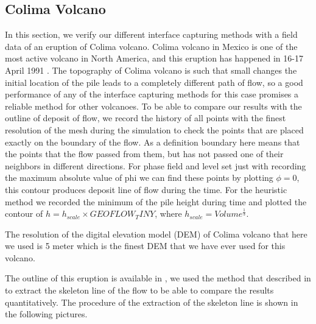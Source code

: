 \documentclass[letterpaper,10pt]{article}
\begin{document}
\subsection{Colima Volcano}
In this section, we verify our different interface capturing methods with a field data of an eruption of Colima volcano. 
Colima volcano in Mexico is one of the most active volcano in North America, and this eruption has happened in 16-17 April 1991 \cite{}. 
The topography of Colima volcano is such that small changes the initial location of the pile leads to a completely different 
path of flow, so a good performance of any of the interface capturing methods for this case promises a reliable method for other volcanoes.
To be able to compare our results with the outline of deposit of flow, we record the history of all points with the finest 
resolution of the mesh during the simulation to check the points that are placed exactly on the boundary of the flow. 
As a definition boundary here means that the points that the flow passed from them, but has not passed one of their neighbors 
in different directions. For phase field and level set just with recording the maximum absolute value of phi we can find 
these points by plotting $\phi=0$, this contour produces deposit line of flow during the time. For the heuristic method we 
recorded the minimum of the pile height during time and plotted the contour of $ h = h_{scale} \times GEOFLOW_TINY$, where 
$ h_{scale} =Volume^\frac{1}{3} $.

The resolution of the digital elevation model (DEM) of Colima volcano that here we used is 5 meter which is the finest DEM 
that we have ever used for this volcano.

The outline of this eruption is available in \cite{namikawa}, we used the method that described in \cite{namikawa} to 
extract the skeleton line of the flow to be able to compare the results quantitatively. The procedure of the extraction of the 
skeleton line is shown in the following pictures. 
\end{document}
